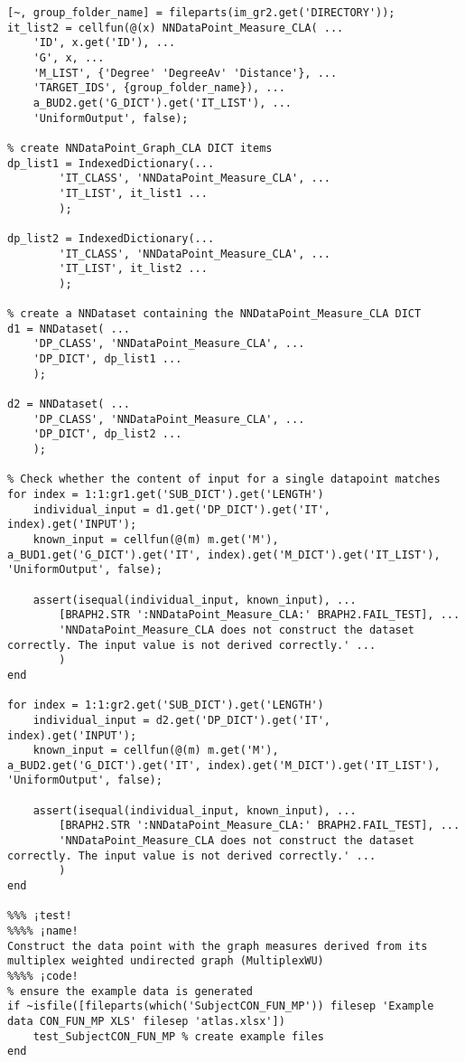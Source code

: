 \documentclass{tufte-handout}
\begin{document}
\begin{lstlisting}
[~, group_folder_name] = fileparts(im_gr2.get('DIRECTORY'));
it_list2 = cellfun(@(x) NNDataPoint_Measure_CLA( ...
    'ID', x.get('ID'), ...
    'G', x, ...
    'M_LIST', {'Degree' 'DegreeAv' 'Distance'}, ...
    'TARGET_IDS', {group_folder_name}), ...
    a_BUD2.get('G_DICT').get('IT_LIST'), ...
    'UniformOutput', false);

% create NNDataPoint_Graph_CLA DICT items
dp_list1 = IndexedDictionary(...
        'IT_CLASS', 'NNDataPoint_Measure_CLA', ...
        'IT_LIST', it_list1 ...
        );

dp_list2 = IndexedDictionary(...
        'IT_CLASS', 'NNDataPoint_Measure_CLA', ...
        'IT_LIST', it_list2 ...
        );

% create a NNDataset containing the NNDataPoint_Measure_CLA DICT
d1 = NNDataset( ...
    'DP_CLASS', 'NNDataPoint_Measure_CLA', ...
    'DP_DICT', dp_list1 ...
    );

d2 = NNDataset( ...
    'DP_CLASS', 'NNDataPoint_Measure_CLA', ...
    'DP_DICT', dp_list2 ...
    );

% Check whether the content of input for a single datapoint matches
for index = 1:1:gr1.get('SUB_DICT').get('LENGTH')
    individual_input = d1.get('DP_DICT').get('IT', index).get('INPUT');
    known_input = cellfun(@(m) m.get('M'), a_BUD1.get('G_DICT').get('IT', index).get('M_DICT').get('IT_LIST'), 'UniformOutput', false);

    assert(isequal(individual_input, known_input), ...
        [BRAPH2.STR ':NNDataPoint_Measure_CLA:' BRAPH2.FAIL_TEST], ...
        'NNDataPoint_Measure_CLA does not construct the dataset correctly. The input value is not derived correctly.' ...
        )
end

for index = 1:1:gr2.get('SUB_DICT').get('LENGTH')
    individual_input = d2.get('DP_DICT').get('IT', index).get('INPUT');
    known_input = cellfun(@(m) m.get('M'), a_BUD2.get('G_DICT').get('IT', index).get('M_DICT').get('IT_LIST'), 'UniformOutput', false);

    assert(isequal(individual_input, known_input), ...
        [BRAPH2.STR ':NNDataPoint_Measure_CLA:' BRAPH2.FAIL_TEST], ...
        'NNDataPoint_Measure_CLA does not construct the dataset correctly. The input value is not derived correctly.' ...
        )
end

%%% ¡test!
%%%% ¡name!
Construct the data point with the graph measures derived from its multiplex weighted undirected graph (MultiplexWU) 
%%%% ¡code!
% ensure the example data is generated
if ~isfile([fileparts(which('SubjectCON_FUN_MP')) filesep 'Example data CON_FUN_MP XLS' filesep 'atlas.xlsx'])
    test_SubjectCON_FUN_MP % create example files
end


\end{lstlisting}
\end{document}
